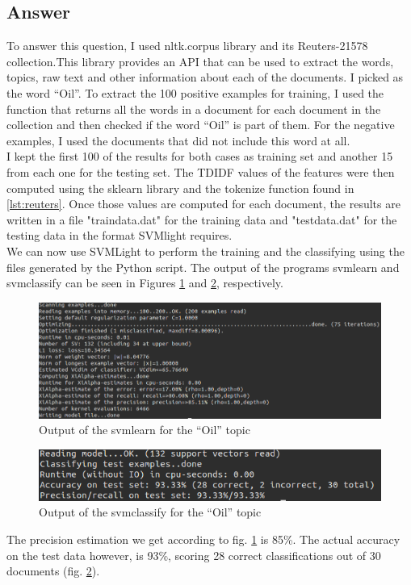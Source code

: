 \documentclass{article}
\begin{document}
\subsection*{Answer}
To answer this question, I used nltk.corpus library and its Reuters-21578 collection.This library provides an API that can be used to extract the words, topics, raw text and other information about each of the documents. I picked as the word ``Oil''. To extract the 100 positive examples for training, I used the function that returns all the words in a document for each document in the collection and then checked if the word ``Oil'' is part of them. For the negative examples, I used the documents that did not include this word at all.\\ I kept the first 100 of the results for both cases as training set and another 15 from each one for the testing set. The TDIDF values of the features were then computed using the sklearn library and the tokenize function found in \ref{lst:reuters}. Once those values are computed for each document, the results are written in a file "train\textunderscore data.dat" for the training data and "test\textunderscore data.dat" for the testing data in the format SVMlight requires.\\ We can now use SVMLight to perform the training and the classifying using the files generated by the Python script. The output of the programs svm\textunderscore learn and svm\textunderscore classify can be seen in Figures \ref{fig:learn} and \ref{fig:classify}, respectively. 


\begin{figure}[h]
			\centering
			\includegraphics[width=\linewidth]{learn_oil.png}
			\caption{Output of the svm\textunderscore learn for the ``Oil'' topic}
			\label{fig:learn}
	\end{figure}
	\begin{figure}[h]
				\centering
				\includegraphics[width=\linewidth]{classify_oil.png}
				\caption{Output of the svm\textunderscore classify for the ``Oil'' topic}
				\label{fig:classify}
		\end{figure}
The precision estimation we get according to fig. \ref{fig:learn} is 85\%. The actual accuracy on the test data however, is 93\%, scoring 28 correct classifications out of 30 documents (fig. \ref{fig:classify}). 
\end{document}
